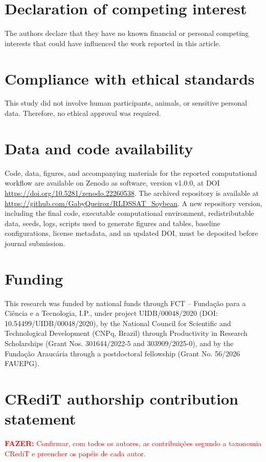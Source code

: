 \documentclass[times,final,authoryear]{elsarticle}
\begin{document}
\section*{Declaration of competing interest}
The authors declare that they have no known financial or personal competing interests that could have influenced the work reported in this article.

\section*{Compliance with ethical standards}
This study did not involve human participants, animals, or sensitive personal data. Therefore, no ethical approval was required.

\section*{Data and code availability}

Code, data, figures, and accompanying materials for the reported computational workflow are available on Zenodo as software, version v1.0.0, at DOI \url{https://doi.org/10.5281/zenodo.22260538}. The archived repository is available at \url{https://github.com/GabyQueiroz/RLDSSAT_Soybean}. A new repository version, including the final code, executable computational environment, redistributable data, seeds, logs, scripts used to generate figures and tables, baseline configurations, license metadata, and an updated DOI, must be deposited before journal submission.

\section*{Funding}
This research was funded by national funds through FCT – Fundação para a Ciência e a Tecnologia, I.P., under project UIDB/00048/2020 (DOI: 10.54499/UIDB/00048/2020), by the National Council for Scientific and Technological Development (CNPq, Brazil) through Productivity in Research Scholarships (Grant Nos. 301644/2022-5 and 303909/2025-0), and by the Fundação Araucária through a postdoctoral fellowship (Grant No. 56/2026 FAUEPG).

\section*{CRediT authorship contribution statement}
\textcolor{red}{\textbf{FAZER:} Confirmar, com todos os autores, as contribuições segundo a taxonomia CRediT e preencher os papéis de cada autor.}
\end{document}
